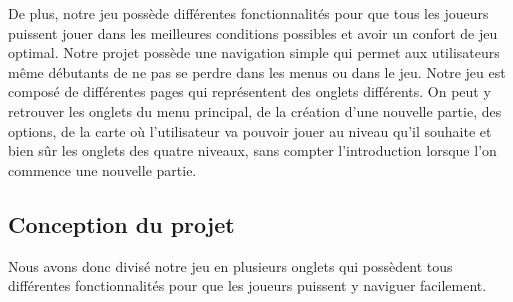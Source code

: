\documentclass[12pt,a4paper]{article}
\begin{document}
            \tabto{1cm} De plus, notre jeu possède différentes fonctionnalités pour que tous les joueurs puissent jouer dans les meilleures conditions possibles et avoir un confort de jeu optimal. Notre projet possède une navigation simple qui permet aux utilisateurs même débutants de ne pas se perdre dans les menus ou dans le jeu. Notre jeu est composé de différentes pages qui représentent des onglets différents. On peut y retrouver les onglets du menu principal, de la création d’une nouvelle partie, des options, de la carte où l'utilisateur va pouvoir jouer au niveau qu'il souhaite et bien sûr les onglets des quatre niveaux, sans compter l’introduction lorsque l'on commence une nouvelle partie.

        \subsection{Conception du projet}
            \tabto{1cm} Nous avons donc divisé notre jeu en plusieurs onglets qui possèdent tous différentes fonctionnalités pour que les joueurs puissent y naviguer facilement.\\
\end{document}
